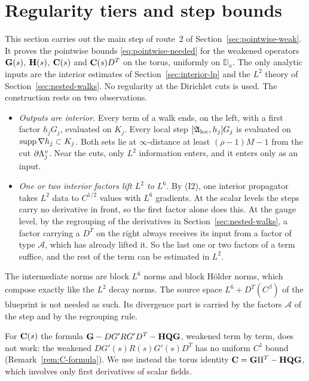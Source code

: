 \section{Regularity tiers and step bounds}\label{sec:tiers}

This section carries out the main step of route~2 of Section~\ref{sec:pointwise-weak}. It proves the pointwise bounds \eqref{eq:pointwise-needed} for the weakened operators $\mathbf G(s)$, $\mathbf H(s)$, $\mathbf C(s)$ and $\mathbf C(s)D^T$ on the torus, uniformly on $\mathbb D_\kappa$. The only analytic inputs are the interior estimates of Section~\ref{sec:interior-lp} and the $L^2$ theory of Section~\ref{sec:nested-walks}. No regularity at the Dirichlet cuts is used. The construction rests on two observations.
\begin{itemize}
\item \emph{Outputs are interior.} Every term of a walk ends, on the left, with a first factor $h_jG_j$, evaluated on $K_j$. Every local step $[\mathfrak A_{\rm loc},h_j]G_j$ is evaluated on $\operatorname{supp}\nabla h_j\subset K_j$. Both sets lie at $\infty$-distance at least $(\rho-1)M-1$ from the cut $\partial\Lambda^v_j$. Near the cuts, only $L^2$ information enters, and it enters only as an input.
\item \emph{One or two interior factors lift $L^2$ to $L^6$.} By (I2), one interior propagator takes $L^2$ data to $C^{1/2}$ values with $L^6$ gradients. At the scalar levels the steps carry no derivative in front, so the first factor alone does this. At the gauge level, by the regrouping of the derivatives in Section~\ref{sec:nested-walks}, a factor carrying a $D^T$ on the right always receives its input from a factor of type $\mathcal A$, which has already lifted it. So the last one or two factors of a term suffice, and the rest of the term can be estimated in $L^2$.
\end{itemize}
The intermediate norms are block $L^6$ norms and block H\"older norms, which compose exactly like the $L^2$ decay norms. The source space $L^6+D^T(C^\beta)$ of the blueprint is not needed as such. Its divergence part is carried by the factors $\mathcal A$ of the step and by the regrouping rule.

For $\mathbf C(s)$ the formula $\mathbf G-DG'RG'D^T-\mathbf H\mathbf Q\mathbf G$, weakened term by term, does not work: the weakened $DG'(s)R(s)G'(s)D^T$ has no uniform $C^1$ bound (Remark~\ref{rem:C-formula}). We use instead the torus identity $\mathbf C=\mathbf G\Pi^T-\mathbf H\mathbf Q\mathbf G$, which involves only first derivatives of scalar fields.

